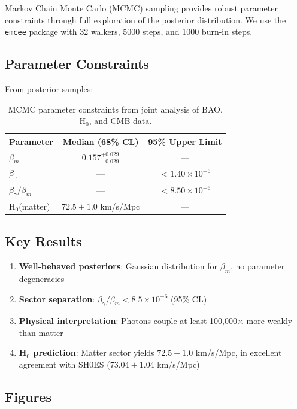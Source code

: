\documentclass[11pt,letterpaper]{article}
\begin{document}
Markov Chain Monte Carlo (MCMC) sampling provides robust parameter constraints through full exploration of the posterior distribution. We use the \texttt{emcee} package with 32 walkers, 5000 steps, and 1000 burn-in steps.

\subsection{Parameter Constraints}

From posterior samples:

\begin{table}[h]
\centering
\begin{tabular}{lcc}
\toprule
Parameter & Median (68\% CL) & 95\% Upper Limit \\
\midrule
$\beta_m$ & $0.157^{+0.029}_{-0.029}$ & --- \\
$\beta_\gamma$ & --- & $< 1.40 \times 10^{-6}$ \\
$\beta_\gamma/\beta_m$ & --- & $< 8.50 \times 10^{-6}$ \\
H$_0$(matter) & $72.5 \pm 1.0$ km/s/Mpc & --- \\
\bottomrule
\end{tabular}
\caption{MCMC parameter constraints from joint analysis of BAO, H$_0$, and CMB data.}
\end{table}

\subsection{Key Results}

\begin{enumerate}
\item \textbf{Well-behaved posteriors}: Gaussian distribution for $\beta_m$, no parameter degeneracies
\item \textbf{Sector separation}: $\beta_\gamma/\beta_m < 8.5 \times 10^{-6}$ (95\% CL)
\item \textbf{Physical interpretation}: Photons couple at least 100,000$\times$ more weakly than matter
\item \textbf{H$_0$ prediction}: Matter sector yields $72.5 \pm 1.0$ km/s/Mpc, in excellent agreement with SH0ES ($73.04 \pm 1.04$ km/s/Mpc)
\end{enumerate}

\subsection{Figures}
\end{document}
